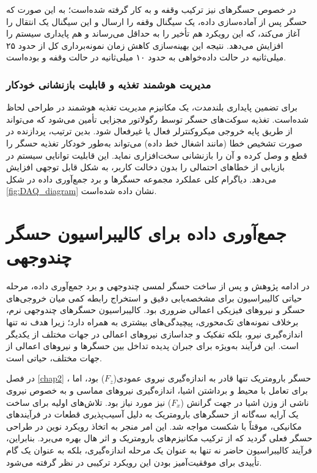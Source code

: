  در خصوص حسگرهای  نیز ترکیب وقفه و  به کار گرفته شده‌‌است؛ به این صورت که حسگر پس از آماده‌سازی داده، یک سیگنال وقفه را ارسال و این سیگنال یک انتقال  را آغاز می‌کند، که این رویکرد هم تأخیر را به حداقل می‌رساند و هم پایداری سیستم را افزایش می‌دهد. نتیجه این بهینه‌سازی کاهش زمان نمونه‌برداری کل از حدود ۲۵ میلی‌ثانیه در حالت  داده‌خواهی
  به حدود ۱۰ میلی‌ثانیه در حالت وقفه و  بوده‌است.
\subsubsection{مدیریت هوشمند تغذیه و قابلیت بازنشانی خودکار}
برای تضمین پایداری بلندمدت، یک مکانیزم مدیریت تغذیه هوشمند در طراحی لحاظ شده‌است. تغذیه سوکت‌های حسگر توسط رگولاتور مجزایی تأمین می‌شود که می‌تواند از طریق پایه خروجی میکروکنترلر فعال یا غیرفعال شود. بدین ترتیب، پردازنده در صورت تشخیص خطا (مانند اشغال خط داده) می‌تواند به‌طور خودکار تغذیه حسگر را قطع و وصل کرده و آن را بازنشانی سخت‌افزاری نماید. این قابلیت توانایی سیستم در بازیابی از خطاهای احتمالی را بدون دخالت کاربر، به شکل قابل توجهی افزایش می‌دهد. دیاگرام کلی عملکرد مجموعه حسگر‌ها و برد جمع‌آوری داده در شکل
\ref{fig:DAQ_diagram}
نشان داده شده‌است.

\section{جمع‌آوری داده برای کالیبراسیون حسگر چندوجهی}
در ادامه پژوهش و پس از ساخت حسگر لمسی چندوجهی و برد جمع‌آوری داده، مرحله حیاتی کالیبراسیون برای مشخصه‌یابی دقیق و استخراج رابطه کمی میان خروجی‌های حسگر و نیروهای فیزیکی اعمالی ضروری بود. کالیبراسیون حسگرهای چندوجهی نرم، برخلاف نمونه‌های تک‌محوری، پیچیدگی‌های بیشتری به همراه دارد؛ زیرا هدف نه تنها اندازه‌گیری نیرو، بلکه تفکیک و جداسازی نیروهای اعمالی در جهات مختلف از یکدیگر است. این فرآیند به‌ویژه برای جبران پدیده تداخل
 بین حسگر‌ها و نیرو‌های اعمالی از جهات مختلف، حیاتی است.

در فصل
\ref{chap2}
، حسگر بارومتریک تنها قادر به اندازه‌گیری نیروی عمودی($F_z$) بود، اما برای تعامل با محیط و برداشتن اشیا، اندازه‌گیری نیروهای مماسی و به خصوص نیروی ناشی از وزن اشیا در جهت گرانش ($F_x$) نیز مورد نیاز بود. تلاش‌های اولیه برای ساخت یک آرایه سه‌گانه از حسگرهای بارومتریک به دلیل آسیب‌‌پذیری قطعات در فرآیندهای مکانیکی، موقتاً با شکست مواجه شد. این امر منجر به اتخاذ رویکرد نوین در طراحی حسگر فعلی گردید که از ترکیب مکانیزم‌های بارومتریک  و اثر هال 
بهره می‌برد. بنابراین، فرآیند کالیبراسیون حاضر نه تنها به عنوان یک مرحله اندازه‌گیری، بلکه به عنوان یک گام تأییدی برای موفقیت‌آمیز بودن این رویکرد ترکیبی در نظر گرفته می‌شود.

